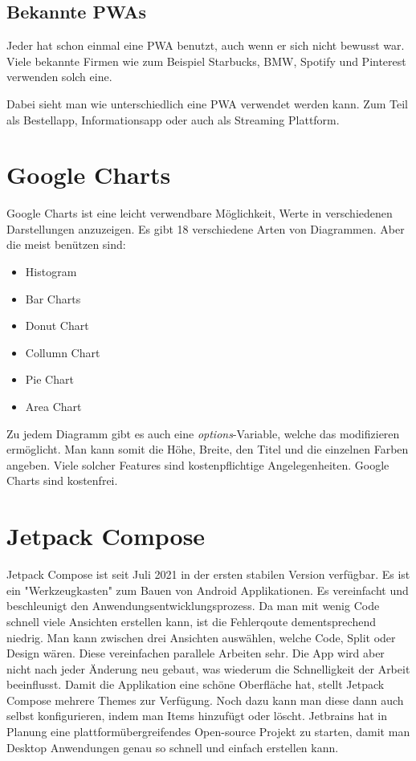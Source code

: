 \subsection{Bekannte PWAs}
\author{Bozidar Spasenovic}

Jeder hat schon einmal eine PWA benutzt, auch wenn er sich nicht bewusst war. Viele bekannte Firmen wie zum Beispiel Starbucks,
BMW, Spotify und Pinterest verwenden solch eine.

Dabei sieht man wie unterschiedlich eine PWA verwendet werden kann. Zum Teil als Bestellapp, Informationsapp oder auch als Streaming Plattform.





\section{Google Charts}
\author{Bozidar Spasenovic}
\cite{Google-Charts}
Google Charts ist eine leicht verwendbare Möglichkeit, Werte in verschiedenen Darstellungen anzuzeigen.
Es gibt 18 verschiedene Arten von Diagrammen. Aber die meist benützen sind:

\begin{itemize}
    \item Histogram
    \item Bar Charts
    \item Donut Chart
    \item Collumn Chart
    \item Pie Chart
    \item Area Chart
\end{itemize}
Zu jedem Diagramm gibt es auch eine \textit{options}-Variable, welche das modifizieren ermöglicht.
Man kann somit die Höhe, Breite, den Titel und die einzelnen Farben angeben.
\linebreak
Viele solcher Features sind kostenpflichtige Angelegenheiten. Google Charts sind kostenfrei.

\section{Jetpack Compose}
\cite{Jetpack-Compose}
\author{Bozidar Spasenovic}
Jetpack Compose ist seit Juli 2021 in der ersten stabilen Version verfügbar. Es ist ein "Werkzeugkasten" zum Bauen von Android Applikationen.
Es vereinfacht und beschleunigt den Anwendungsentwicklungsprozess. Da man mit wenig Code schnell viele Ansichten erstellen kann, ist die Fehlerqoute dementsprechend niedrig.
Man kann zwischen drei Ansichten auswählen, welche Code, Split oder Design wären. Diese vereinfachen parallele Arbeiten sehr. 
Die App wird aber nicht nach jeder Änderung neu gebaut, was wiederum die Schnelligkeit der Arbeit beeinflusst. Damit die Applikation eine schöne Oberfläche hat, stellt
Jetpack Compose mehrere Themes zur Verfügung. Noch dazu kann man diese dann auch selbst konfigurieren, indem man Items hinzufügt oder löscht.
Jetbrains hat in Planung eine plattformübergreifendes Open-source Projekt zu starten, damit man Desktop Anwendungen genau so schnell und einfach erstellen kann. 

